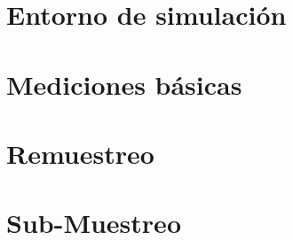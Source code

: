 

\pagebreak

\section{Entorno de simulación}
	\label{Ejercicio-5}
	
	
\pagebreak

\section{Mediciones básicas}
	\label{Ejercicio-6}
	
	
\pagebreak

\section{Remuestreo}
	\label{Ejercicio-7}
	
	
\pagebreak	
\section{Sub-Muestreo}
	\label{Ejercicio-8}
	
	
